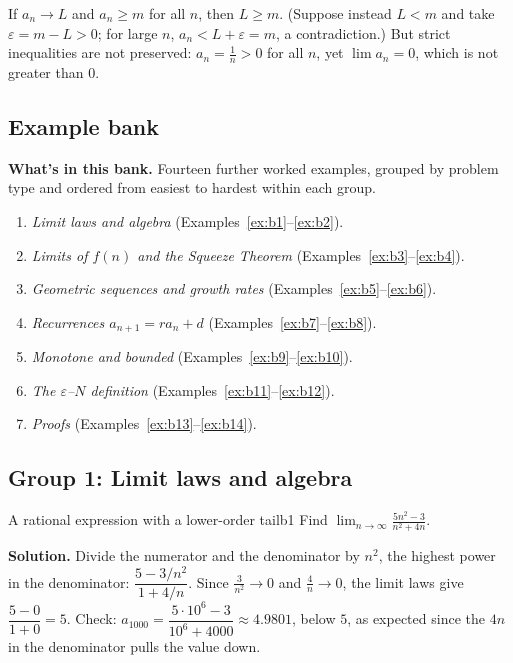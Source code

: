 \documentclass[11pt]{article}
\begin{document}
\begin{remark}
If $a_n\to L$ and $a_n\ge m$ for all $n$, then $L\ge m$. (Suppose instead $L<m$ and take $\varepsilon=m-L>0$; for large $n$, $a_n<L+\varepsilon=m$, a contradiction.) But strict inequalities are not preserved: $a_n=\frac1n>0$ for all $n$, yet $\lim a_n=0$, which is not greater than $0$.
\end{remark}

\subsection*{Example bank}

\textbf{What's in this bank.} Fourteen further worked examples, grouped by problem type and ordered from easiest to hardest within each group.
\begin{enumerate}[nosep]
  \item \emph{Limit laws and algebra} (Examples~\ref{ex:b1}--\ref{ex:b2}).
  \item \emph{Limits of $f(n)$ and the Squeeze Theorem} (Examples~\ref{ex:b3}--\ref{ex:b4}).
  \item \emph{Geometric sequences and growth rates} (Examples~\ref{ex:b5}--\ref{ex:b6}).
  \item \emph{Recurrences $a_{n+1}=ra_n+d$} (Examples~\ref{ex:b7}--\ref{ex:b8}).
  \item \emph{Monotone and bounded} (Examples~\ref{ex:b9}--\ref{ex:b10}).
  \item \emph{The $\varepsilon$--$N$ definition} (Examples~\ref{ex:b11}--\ref{ex:b12}).
  \item \emph{Proofs} (Examples~\ref{ex:b13}--\ref{ex:b14}).
\end{enumerate}

\subsection*{Group 1: Limit laws and algebra}

\begin{exmp}{A rational expression with a lower-order tail}{b1}
Find $\displaystyle\lim_{n\to\infty}\frac{5n^2-3}{n^2+4n}$.

\textbf{Solution.} Divide the numerator and the denominator by $n^2$, the highest power in the denominator: $\dfrac{5-3/n^2}{1+4/n}$. Since $\frac3{n^2}\to0$ and $\frac4n\to0$, the limit laws give $\dfrac{5-0}{1+0}=5$. Check: $a_{1000}=\dfrac{5\cdot10^6-3}{10^6+4000}\approx4.9801$, below $5$, as expected since the $4n$ in the denominator pulls the value down.
\end{exmp}
\end{document}
